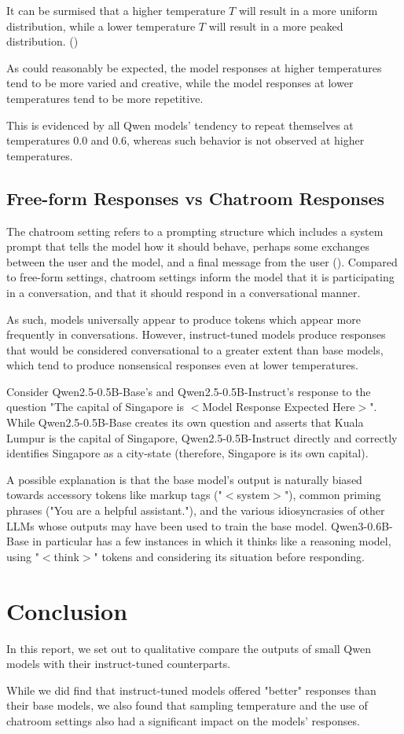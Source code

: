 \documentclass{article} %
\begin{document}
It can be surmised that a higher temperature $T$ will result in a more uniform distribution,
while a lower temperature $T$ will result in a more peaked distribution. (\cite{Goodfellow-et-al-2016})

As could reasonably be expected, the model responses
at higher temperatures tend to be more varied and creative,
while the model responses at lower temperatures tend to be more repetitive.

This is evidenced by all Qwen models' tendency to repeat themselves
at temperatures 0.0 and 0.6, whereas such behavior is not observed at higher temperatures.

\subsection{Free-form Responses vs Chatroom Responses}
The chatroom setting refers to a prompting structure which
includes a system prompt that tells the model how it should behave,
perhaps some exchanges between the user and the model,
and a final message from the user (\cite{Kwon-et-al-2023}).
Compared to free-form settings, chatroom settings
inform the model that it is participating in a conversation,
and that it should respond in a conversational manner.

As such, models universally appear to produce tokens which appear more 
frequently in conversations.
However, instruct-tuned models produce responses that would
be considered conversational to a greater extent than base models,
which tend to produce nonsensical responses even at lower temperatures.

Consider Qwen2.5-0.5B-Base's and Qwen2.5-0.5B-Instruct's response to the question
"The capital of Singapore is $<$Model Response Expected Here$>$".
While Qwen2.5-0.5B-Base creates its own question and 
asserts that Kuala Lumpur is the capital of Singapore,
Qwen2.5-0.5B-Instruct directly and correctly identifies Singapore as a city-state
(therefore, Singapore is its own capital).

A possible explanation is that the base model's output
is naturally biased towards accessory tokens like markup tags ("$<$system$>$"),
common priming phrases ("You are a helpful assistant."),
and the various idiosyncrasies of other LLMs whose outputs
may have been used to train the base model. Qwen3-0.6B-Base in particular
has a few instances in which it thinks like a reasoning model, using
"$<$think$>$" tokens and considering its situation before responding.

\section{Conclusion}

In this report, we set out to qualitative compare 
the outputs of small Qwen models with their instruct-tuned counterparts.

While we did find that instruct-tuned models
offered "better" responses than their base models,
we also found that sampling temperature
and the use of chatroom settings
also had a significant impact on the models' responses.




\appendix
\end{document}
